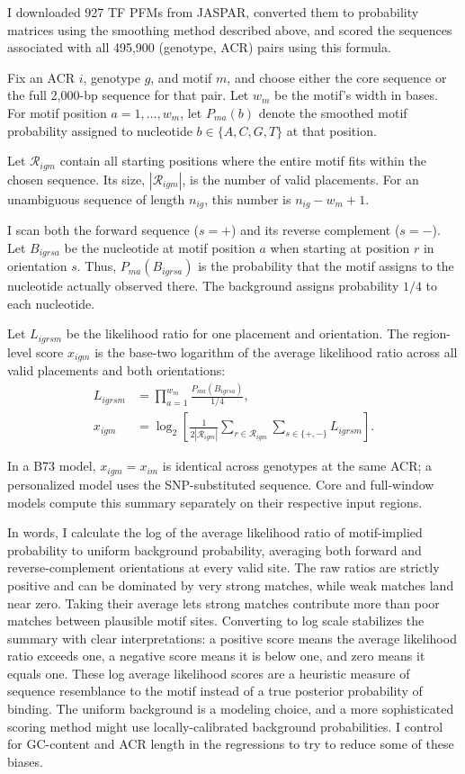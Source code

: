 \documentclass[10pt]{article}
\begin{document}
I downloaded 927 TF PFMs from JASPAR, converted them to probability matrices using the smoothing method described above, and scored the sequences associated with all 495,900 (genotype, ACR) pairs using this formula. 

Fix an ACR $i$, genotype $g$, and motif $m$, and choose either the core
sequence or the full 2,000-bp sequence for that pair. Let $w_m$ be the
motif's width in bases. For motif position $a=1,\ldots,w_m$, let
$P_{ma}(b)$ denote the smoothed motif probability assigned to nucleotide
$b\in\{A,C,G,T\}$ at that position.

Let $\mathcal R_{igm}$ contain all starting positions where the entire
motif fits within the chosen sequence. Its size, $|\mathcal R_{igm}|$,
is the number of valid placements. For an unambiguous sequence of
length $n_{ig}$, this number is $n_{ig}-w_m+1$.

I scan both the forward sequence ($s=+$) and its reverse complement
($s=-$). Let $B_{igrsa}$ be the nucleotide at motif position $a$ when
starting at position $r$ in orientation $s$. Thus,
$P_{ma}(B_{igrsa})$ is the probability that the motif assigns to the
nucleotide actually observed there. The background assigns probability
$1/4$ to each nucleotide.

Let $L_{igrsm}$ be the likelihood ratio for one placement and
orientation. The region-level score $x_{igm}$ is the base-two logarithm
of the average likelihood ratio across all valid placements and both
orientations:
\begin{align}
L_{igrsm}
&=\prod_{a=1}^{w_m}\frac{P_{ma}(B_{igrsa})}{1/4},\\
x_{igm}
&=\log_2\left[
\frac{1}{2|\mathcal R_{igm}|}
\sum_{r\in\mathcal R_{igm}}\sum_{s\in\{+,-\}}L_{igrsm}
\right].
\label{eq:score}
\end{align}

In a B73 model, $x_{igm}=x_{im}$ is identical across genotypes at the
same ACR; a personalized model uses the SNP-substituted sequence.
Core and full-window models compute this summary separately on their
respective input regions.

In words, I calculate the log of the average likelihood ratio of motif-implied probability to uniform background probability, averaging both forward and reverse-complement orientations at every valid site. The raw ratios are strictly positive and can be dominated by very strong matches, while weak matches land near zero. Taking their average lets strong matches contribute more than poor matches between plausible motif sites. Converting to log scale stabilizes the summary with clear interpretations: a positive score means the average likelihood ratio exceeds one, a negative score means it is below one, and zero means it equals one. These log average likelihood scores are a heuristic measure of sequence resemblance to the motif instead of a true posterior probability of binding. The uniform background is a modeling choice, and a more sophisticated scoring method might use locally-calibrated background probabilities. I control for GC-content and ACR length in the regressions to try to reduce some of these biases.  
\end{document}
